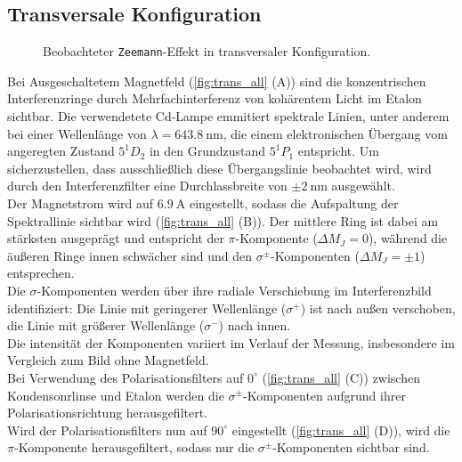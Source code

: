 \subsection{Transversale Konfiguration}
\begin{figure}[ht]
    \centering
    \caption{Beobachteter \texttt{Zeemann}-Effekt in transversaler Konfiguration.}
\end{figure}
\clearpage
\noindent Bei Ausgeschaltetem Magnetfeld (\cref{fig:trans_all} (A)) sind die konzentrischen Interferenzringe durch Mehrfachinterferenz von kohärentem Licht im Etalon sichtbar. Die verwendetete Cd-Lampe emmitiert spektrale Linien, unter anderem bei einer Wellenlänge von $\lambda = \SI{643,8}{\nano\meter}$, die einem elektronischen Übergang vom angeregten Zustand $5^1D_2$ in den Grundzustand $5^1P_1$ entspricht. Um sicherzustellen, dass ausschließlich diese Übergangslinie beobachtet wird, wird durch den Interferenzfilter eine Durchlassbreite von $\pm \SI{2}{\nano\meter}$ ausgewählt.
\vspace{0.2cm}\\
Der Magnetstrom wird auf $\SI{6,9}{\ampere}$ eingestellt, sodass die Aufspaltung der Spektrallinie sichtbar wird (\cref{fig:trans_all} (B)). Der mittlere Ring ist dabei am stärksten ausgeprägt und entspricht der $\pi$-Komponente ($\Delta M_J=0$), während die äußeren Ringe innen schwächer sind und den $\sigma^\pm$-Komponenten ($\Delta M_J=\pm 1$) entsprechen.\\ 
Die $\sigma$-Komponenten werden über ihre radiale Verschiebung im Interferenzbild identifiziert: Die Linie mit geringerer Wellenlänge ($\sigma^+$) ist nach außen verschoben, die Linie mit größerer Wellenlänge ($\sigma^-$) nach innen.\\
Die intensität der Komponenten variiert im Verlauf der Messung, insbesondere im Vergleich zum Bild ohne Magnetfeld.
\vspace{0.2cm}\\
\noindent Bei Verwendung des Polarisationsfilters auf $0^{\circ}$ (\cref{fig:trans_all} (C)) zwischen Kondensonrlinse und Etalon werden die $\sigma^\pm$-Komponenten aufgrund ihrer Polarisationsrichtung herausgefiltert.
\vspace{0.2cm}\\
\noindent Wird der Polarisationsfilters nun auf $90^{\circ}$ eingestellt (\cref{fig:trans_all} (D)), wird die $\pi$-Komponente herausgefiltert, sodass nur die $\sigma^\pm$-Komponenten sichtbar sind.
%
%

